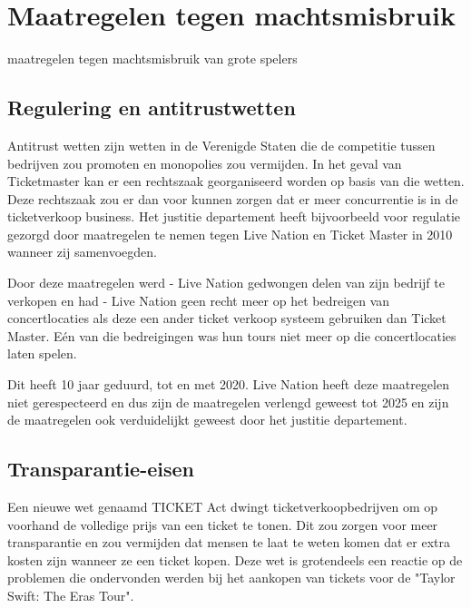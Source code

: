 
\section{Maatregelen tegen machtsmisbruik}

maatregelen tegen machtsmisbruik van grote spelers

\subsection{Regulering en antitrustwetten}

Antitrust wetten zijn wetten in de Verenigde Staten die de competitie tussen bedrijven zou promoten en monopolies
zou vermijden. In het geval van Ticketmaster kan er een rechtszaak georganiseerd worden op basis van die wetten.
Deze rechtszaak zou er dan voor kunnen zorgen dat er meer concurrentie is in de ticketverkoop business. 
Het justitie departement heeft bijvoorbeeld voor regulatie gezorgd door maatregelen te nemen tegen 
Live Nation en Ticket Master in 2010 wanneer zij samenvoegden.
 
Door deze maatregelen werd
- Live Nation gedwongen delen van zijn bedrijf te verkopen en had
- Live Nation geen recht meer op het bedreigen van concertlocaties als deze een ander ticket verkoop systeem gebruiken dan 
  Ticket Master. Eén van die bedreigingen was hun tours niet meer op die concertlocaties laten spelen.   

Dit heeft 10 jaar geduurd, tot en met 2020. Live Nation heeft deze maatregelen niet gerespecteerd en dus zijn de 
maatregelen verlengd geweest tot 2025 en zijn de maatregelen ook verduidelijkt geweest door het justitie departement.


\subsection{Transparantie-eisen}

Een nieuwe wet genaamd TICKET Act dwingt ticketverkoopbedrijven om op voorhand de volledige prijs van een ticket
te tonen. Dit zou zorgen voor meer transparantie en zou vermijden dat mensen te laat te weten komen dat er extra 
kosten zijn wanneer ze een ticket kopen. Deze wet is grotendeels een reactie op de problemen die ondervonden werden
bij het aankopen van tickets voor de "Taylor Swift: The Eras Tour".


